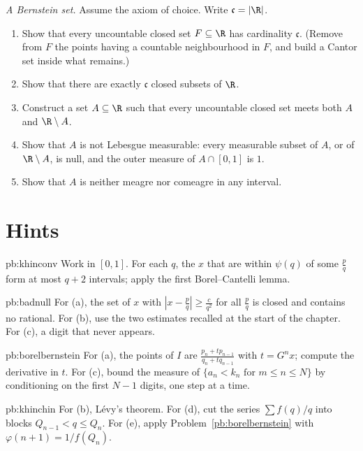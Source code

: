 \begin{exercise}[$\star\star\star$]\label{pb:bernsteinset}
\emph{A Bernstein set.} Assume the axiom of choice. Write $\mathfrak c=|\R|$.
\begin{enumerate}[label=(\alph*)]
\item Show that every uncountable closed set $F\subseteq\R$ has cardinality $\mathfrak c$. (Remove from $F$ the points having a countable neighbourhood in $F$,
and build a Cantor set inside what remains.)
\item Show that there are exactly $\mathfrak c$ closed subsets of $\R$.
\item Construct a set $A\subseteq\R$ such that every uncountable closed set meets both $A$ and $\R\setminus A$.
\item Show that $A$ is not Lebesgue measurable: every measurable subset of $A$, or of $\R\setminus A$, is null, and the outer measure of $A\cap[0,1]$ is $1$.
\item Show that $A$ is neither meagre nor comeagre in any interval.
\end{enumerate}
\end{exercise}

\section*{Hints}

\begin{hint}{pb:khinconv}
Work in $[0,1]$. For each $q$, the $x$ that are within $\psi(q)$ of some $\frac pq$ form at most $q+2$ intervals; apply the first Borel--Cantelli lemma.
\end{hint}

\begin{hint}{pb:badnull}
For (a), the set of $x$ with $|x-\frac pq|\ge\frac c{q^2}$ for all $\frac pq$ is closed and contains no rational. For (b), use the two estimates recalled at the
start of the chapter. For (c), a digit that never appears.
\end{hint}

\begin{hint}{pb:borelbernstein}
For (a), the points of $I$ are $\frac{p_n+tp_{n-1}}{q_n+tq_{n-1}}$ with $t=G^nx$; compute the derivative in $t$. For (c), bound the measure of
$\{a_n<k_n\text{ for }m\le n\le N\}$ by conditioning on the first $N-1$ digits, one step at a time.
\end{hint}

\begin{hint}{pb:khinchin}
For (b), Lévy's theorem. For (d), cut the series $\sum f(q)/q$ into blocks $Q_{n-1}<q\le Q_n$. For (e), apply Problem~\ref{pb:borelbernstein} with
$\varphi(n+1)=1/f(Q_n)$.
\end{hint}

